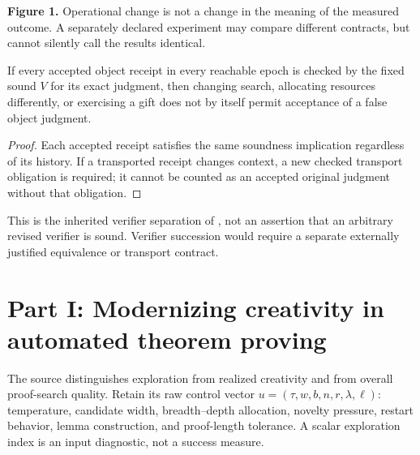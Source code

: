 \documentclass[11pt]{article}
\theoremstyle{definition}\newtheorem{definition}[theorem]{Definition}\newtheorem{conjecture}[theorem]{Conjecture}\newtheorem{example}[theorem]{Example}
\begin{document}
\begin{center}
\end{center}
\textbf{Figure 1.} Operational change is not a change in the meaning of the measured outcome. A separately declared experiment may compare different contracts, but cannot silently call the results identical.

\begin{proposition}
If every accepted object receipt in every reachable epoch is checked by the fixed sound $V$ for its exact judgment, then changing search, allocating resources differently, or exercising a gift does not by itself permit acceptance of a false object judgment.
\end{proposition}
\begin{proof}Each accepted receipt satisfies the same soundness implication regardless of its history. If a transported receipt changes context, a new checked transport obligation is required; it cannot be counted as an accepted original judgment without that obligation.\end{proof}
This is the inherited verifier separation of \cite{creativity}, not an assertion that an arbitrary revised verifier is sound. Verifier succession would require a separate externally justified equivalence or transport contract.

\section{Part I: Modernizing creativity in automated theorem proving}
The source distinguishes exploration from realized creativity and from overall proof-search quality. Retain its raw control vector $u=(\tau,w,b,n,r,\lambda,\ell)$: temperature, candidate width, breadth--depth allocation, novelty pressure, restart behavior, lemma construction, and proof-length tolerance. A scalar exploration index is an input diagnostic, not a success measure.
\end{document}
